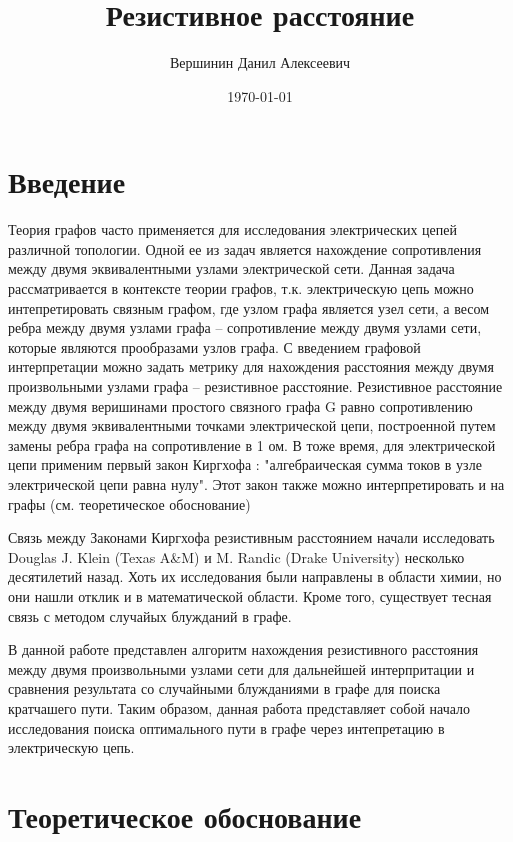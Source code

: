 \documentclass{article}
\title{\vspace{-1cm}Резистивное расстояние}
\author{Вершинин Данил Алексеевич}
\date{\today}
\begin{document}
	
	\maketitle
	\section{Введение}
		Теория графов часто применяется для исследования электрических цепей различной топологии. Одной ее из задач является нахождение сопротивления между двумя эквивалентными узлами электрической сети.
	Данная задача рассматривается в контексте теории графов, т.к. электрическую цепь можно интепретировать связным графом, где узлом графа является узел сети, 
	а весом ребра между двумя узлами графа -- сопротивление между двумя узлами сети, которые являются прообразами узлов графа. С введением графовой интерпретации можно задать метрику для нахождения 
	расстояния между двумя произвольными узлами графа -- резистивное расстояние\cite{RD}. Резистивное расстояние между двумя веришинами простого связного графа G равно сопротивлению между двумя эквивалентными 
	точками электрической цепи, построенной путем замены ребра графа на сопротивление в 1 ом.
	В тоже время, для электрической цепи применим первый закон Киргхофа : "алгебраическая сумма токов в узле электрической цепи равна нулу". Этот закон также можно интерпретировать и на графы (см. теоретическое обоснование)
	
	Связь между Законами Киргхофа резистивным расстоянием начали исследовать Douglas J. Klein (Texas A\&M) и  M. Randic (Drake University)\cite{RD2} несколько десятилетий назад. Хоть их исследования были направлены в области химии, но они нашли отклик и в математической области. Кроме того, существует тесная связь с методом случайых блужданий в графе.
	
	В данной работе представлен алгоритм нахождения резистивного расстояния между двумя произвольными узлами сети для дальнейшей интерпритации и сравнения результата со случайными блужданиями в графе для поиска кратчашего пути.
	Таким образом, данная работа представляет собой начало исследования поиска оптимального пути в графе через интепретацию в электрическую цепь.
	
	\section{Теоретическое обоснование\cite{ss}}
	
\end{document}
